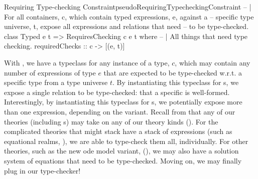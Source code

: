 \begin{pseudohaskell}{Requiring Type-checking Constraint}{pseudoRequiringTypecheckingConstraint}
-- | For all containers, c, which contain typed expressions, e, against a
--   specific type universe, t, expose all expressions and relations that need 
--   to be type-checked.
class Typed e t => RequiresChecking c e t where
  -- | All things that need type checking.
  requiredChecks :: c -> [(e, t)]
\end{pseudohaskell}

With , we have a typeclass for any instance of a
type, \(c\), which may contain any number of expressions of type \(e\) that are
expected to be type-checked w.r.t. a specific type from a type universe \(t\).
By instantiating this typeclass for \DataDefinition{}s, we expose a single
relation to be type-checked: that a specific \QDefinition{} is well-formed.
Interestingly, by instantiating this typeclass for \InstanceModel{}s, we
potentially expose more than one expression, depending on the \ModelKind{}
variant. Recall from  that any of our theories (including
\InstanceModel{}s) may take on any of our theory kinds (\ModelKinds{}). For the
complicated theories that might stack have a stack of expressions (such as
equational realms,
),
we are able to type-check them all, individually. For other theories, such as
the new \acs{ode} model variant, \NewDEModel{} (\DifferentialModel{}), we may
also have a solution system of equations \cite{Chen2022MEng} that need to be
type-checked. Moving on, we may finally plug in our type-checker!


